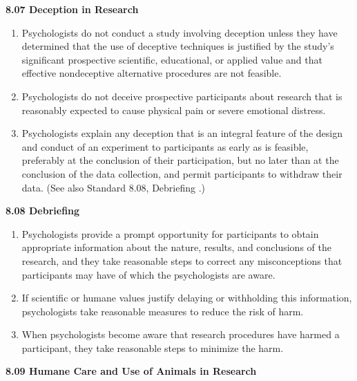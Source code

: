 \documentclass[
]{krantz}
\begin{document}
\textbf{8.07 Deception in Research}

\begin{enumerate}
\def\labelenumi{(\alph{enumi})}
\item
  Psychologists do not conduct a study involving deception unless they have determined that the use of deceptive techniques is justified by the study's significant prospective scientific, educational, or applied value and that effective nondeceptive alternative procedures are not feasible.
\item
  Psychologists do not deceive prospective participants about research that is reasonably expected to cause physical pain or severe emotional distress.
\item
  Psychologists explain any deception that is an integral feature of the design and conduct of an experiment to participants as early as is feasible, preferably at the conclusion of their participation, but no later than at the conclusion of the data collection, and permit participants to withdraw their data. (See also Standard 8.08, Debriefing .)
\end{enumerate}

\textbf{8.08 Debriefing}

\begin{enumerate}
\def\labelenumi{(\alph{enumi})}
\item
  Psychologists provide a prompt opportunity for participants to obtain appropriate information about the nature, results, and conclusions of the research, and they take reasonable steps to correct any misconceptions that participants may have of which the psychologists are aware.
\item
  If scientific or humane values justify delaying or withholding this information, psychologists take reasonable measures to reduce the risk of harm.
\item
  When psychologists become aware that research procedures have harmed a participant, they take reasonable steps to minimize the harm.
\end{enumerate}

\textbf{8.09 Humane Care and Use of Animals in Research}
\end{document}
